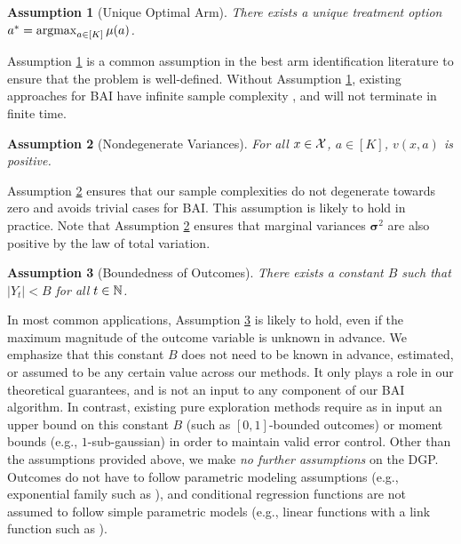 \documentclass{article}
\newtheorem{assumption}{Assumption}
\begin{document}
\begin{assumption}[Unique Optimal Arm]\label{assump:unique_optimal_arm}
    There exists a unique treatment option $a^* = \argmax_{a \in [K]} \mu(a)$. 
\end{assumption}
Assumption \ref{assump:unique_optimal_arm} is a common assumption in the best arm identification literature to ensure that the problem is well-defined. Without Assumption \ref{assump:unique_optimal_arm}, existing approaches for BAI have infinite sample complexity \citep{bai, garivier2016optimalbestarmidentification}, and will not terminate in finite time. 

\begin{assumption}[Nondegenerate Variances]\label{assump:nonzero_variances}
    For all $x \in \mathcal{X}$, $a \in [K]$, $v(x,a)$ is positive.
\end{assumption}

Assumption \ref{assump:nonzero_variances} ensures that our sample complexities do not degenerate towards zero and avoids trivial cases for BAI. This assumption is likely to hold in practice. 
Note that Assumption \ref{assump:nonzero_variances} ensures that marginal variances $\bm{\sigma}^2$ are also positive by the law of total variation. 



\begin{assumption}[Boundedness of Outcomes]\label{assump:bounded_outcomes}
    There exists a constant $B$ such that $|Y_t| < B$ for all $t \in \mathbb{N}$. 
\end{assumption}

In most common applications, Assumption \ref{assump:bounded_outcomes} is likely to hold, even if the maximum magnitude of the outcome variable is unknown in advance. We emphasize that this constant $B$ does not need to be known in advance, estimated, or assumed to be any certain value across our methods. It only plays a role in our theoretical guarantees, and is not an input to any component of our BAI algorithm. In contrast, existing pure exploration methods \citep{garivier2016optimalbestarmidentification, cho2024rewardmaximizationpureexploration} require as in input an upper bound on this constant $B$ (such as $[0,1]$-bounded outcomes) or moment bounds (e.g., $1$-sub-gaussian) in order to maintain valid error control. Other than the assumptions provided above, we make \textit{no further assumptions} on the DGP. Outcomes do not have to follow parametric modeling assumptions (e.g., exponential family such as \citealp{garivier2016optimalbestarmidentification}), and conditional regression functions are not assumed to follow simple parametric models (e.g., linear functions with a link function such as \citealp{kazerouni2019bestarmidentificationgeneralized}). 
\end{document}
